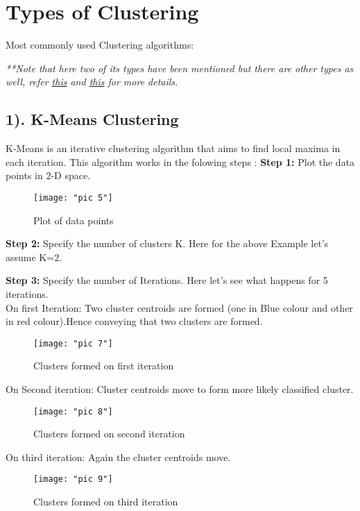 \documentclass[Proceedings]{ascelike}
\begin{document}
\section{Types of Clustering}
\vspace{3mm}
Most commonly used Clustering algorithms:\\
{{\small\textit{**Note that here two of its types have been mentioned but there are other types as well, refer \href{https://home.deib.polimi.it/matteucc/Clustering/tutorial_html/index.html}{this} and \href{https://www.analyticsvidhya.com/blog/2013/11/getting-clustering-right/}{this} for more details.}}
	
\subsection{1). K-Means Clustering}
K-Means is an iterative clustering algorithm that aims to find local maxima in each iteration. This algorithm works in the folowing steps :
\newpage
\textbf{Step 1:} Plot the data points in 2-D space.
\begin{figure}[!htb]
	\centering
	\texttt{[image: "pic 5"]}
	\caption{Plot of data points}
	\label{Plot of data points}
\end{figure}

\textbf{Step 2:} Specify the number of clusters K. Here for the above Example let's assume K=2.

\textbf{Step 3:} Specify the number of Iterations. Here let's see what happens for 5 iterations.\\
\newpage
On first Iteration: Two cluster centroids are formed (one in Blue colour and other in  red colour).Hence conveying that two clusters are formed.
\begin{figure}[!ht]
	\centering
	\texttt{[image: "pic 7"]}
	\caption{Clusters formed on first iteration}
	\label{fig:pic-6}
\end{figure}

On Second iteration: Cluster centroids move to form more likely classified cluster.
\begin{figure}[!ht]
	\centering
	\texttt{[image: "pic 8"]}
	\caption{Clusters formed on second iteration}
	\label{fig:pic-8}
\end{figure}
\newpage
On third iteration: Again the cluster centroids move.
\begin{figure}[!ht]
	\centering
	\texttt{[image: "pic 9"]}
	\caption{Clusters formed on third iteration}
	\label{fig:pic-9}
\end{figure}

}
\end{document}
